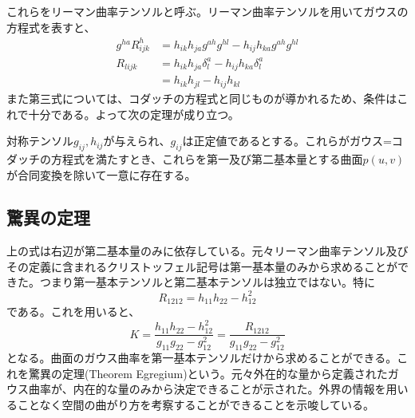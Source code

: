         これらをリーマン曲率テンソルと呼ぶ。リーマン曲率テンソルを用いてガウスの方程式を表すと、
        \begin{align*}
            g^{ha}R^h_{ijk} &= h_{ik}h_{ja}g^{ah}g^{hl} - h_{ij}h_{ka}g^{ah}g^{hl}\\
            R_{lijk} &= h_{ik}h_{ja}\delta_l^a - h_{ij}h_{ka}\delta_l^a\\
            &= h_{ik}h_{jl} - h_{ij}h_{kl}
        \end{align*}
        また第三式については、コダッチの方程式と同じものが導かれるため、条件はこれで十分である。よって次の定理が成り立つ。
        \begin{thm}[曲面論の基本定理]
            対称テンソル$g_{ij}, h_{ij}$が与えられ、$g_{ij}$は正定値であるとする。これらがガウス=コダッチの方程式を満たすとき、これらを第一及び第二基本量とする曲面$p(u,v)$が合同変換を除いて一意に存在する。
        \end{thm}

    \subsection{驚異の定理}
        上の式は右辺が第二基本量のみに依存している。元々リーマン曲率テンソル及びその定義に含まれるクリストッフェル記号は第一基本量のみから求めることができた。つまり第一基本テンソルと第二基本テンソルは独立ではない。特に
            \[R_{1212} = h_{11}h_{22} - h_{12}^2\]
        である。これを用いると、
            \[K = \frac{h_{11}h_{22} - h_{12}^2}{g_{11}g_{22} - g_{12}^2} = \frac{R_{1212}}{g_{11}g_{22}-g_{12}^2}\]
        となる。曲面のガウス曲率を第一基本テンソルだけから求めることができる。これを驚異の定理(Theorem Egregium)という。元々外在的な量から定義されたガウス曲率が、内在的な量のみから決定できることが示された。外界の情報を用いることなく空間の曲がり方を考察することができることを示唆している。


